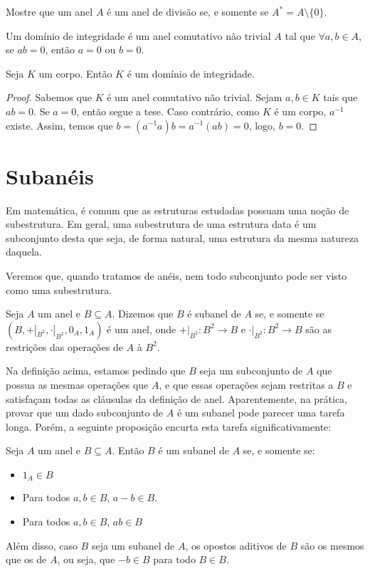\begin{exer}
    Mostre que um anel $A$ é um anel de divisão se, e somente se $A^*=A\setminus\{0\}$.
\end{exer}
\begin{definition}
    Um domínio de integridade é um anel comutativo não trivial $A$ tal que $\forall a, b \in A$, se $ab=0$, então $a=0$ ou $b=0$.
\end{definition}

\begin{prop}
    Seja $K$ um corpo.
    Então $K$ é um domínio de integridade.
\end{prop}
\begin{proof}
Sabemos que $K$ é um anel comutativo não trivial.
Sejam $a, b \in K$ tais que $ab=0$.
Se $a=0$, então segue a tese.
Caso contrário, como $K$ é um corpo, $a^{-1}$ existe.
Assim, temos que $b=(a^{-1}a)b=a^{-1}(ab)=0$, logo, $b=0$.
\end{proof}


\section{Subanéis}
Em matemática, é comum que as estruturas estudadas possuam uma noção de subestrutura.
Em geral, uma subestrutura de uma estrutura data é um subconjunto desta que seja, de forma natural, uma estrutura da mesma natureza daquela.

Veremos que, quando tratamos de anéis, nem todo subconjunto pode ser visto como uma subestrutura.

\begin{definition}[Subanel]
    Seja $A$ um anel e $B \subseteq A$. Dizemos que $B$ é subanel de $A$ se, e somente se $(B, +|_{B^2}, \cdot|_{B^2}, 0_A, 1_A)$ é um anel, onde $+|_{B^2}:B^2\rightarrow B$ e $\cdot|_{B^2}:B^2\rightarrow B$ são as restrições das operações de $A$ à $B^2$.
\end{definition}

Na definição acima, estamos pedindo que $B$ seja um subconjunto de $A$ que possua as mesmas operações que $A$, e que essas operações sejam restritas a $B$ e satisfaçam todas as cláusulas da definição de anel. Aparentemente, na prática, provar que um dado subconjunto de $A$ é um subanel pode parecer uma tarefa longa. Porém, a seguinte proposição encurta esta tarefa significativamente: 

\begin{definition}[Subanel]
    Seja $A$ um anel e $B\subseteq A$. Então $B$ é um subanel de $A$ se, e somente se:
    \begin{itemize}
        \item $1_A \in B$
        \item Para todos $a, b \in B$, $a-b \in B$.
        \item Para todos $a, b \in B$, $ab\in B$
    \end{itemize}

    Além disso, caso $B$ seja um subanel de $A$, os opostos aditivos de $B$ são os mesmos que os de $A$, ou seja, que $-b \in B$ para todo $B \in B$.
\end{definition}

